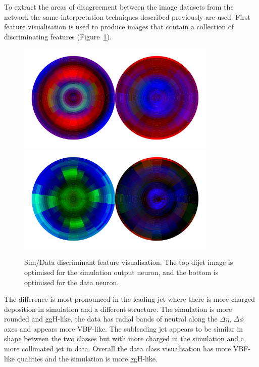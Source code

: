 To extract the areas of disagreement between the image datasets from the network the same interpretation techniques described previously are used. 
First feature visualisation is used to produce images that contain a collection of discriminating features (Figure~\ref{fig:event_categorisation:zee_data_sim_feature_vis}).
\begin{figure}[h!]
    \begin{center}
        \includegraphics[width=0.85\textwidth]{figures/event_selection/zee_norm_logits0.pdf}
        \includegraphics[width=0.85\textwidth]{figures/event_selection/zee_norm_logits1.pdf}
    \end{center}
    \caption{Sim/Data discriminant feature visualisation. The top dijet image is optimised for the simulation output neuron, and the bottom is optimised for the data neuron.} 
    \label{fig:event_categorisation:zee_data_sim_feature_vis}
\end{figure}

The difference is most pronounced in the leading jet where there is more charged \pt deposition in simulation and a different structure. The simulation is more rounded and ggH-like, the data has radial bands of neutral \pt along the $\Delta\eta$, $\Delta\phi$ axes and appears more VBF-like.   
The subleading jet appears to be similar in shape between the two classes but with more charged \pt in the simulation and a more collimated jet in data. Overall the data class visualisation has more VBF-like qualities and the simulation is more ggH-like. 

